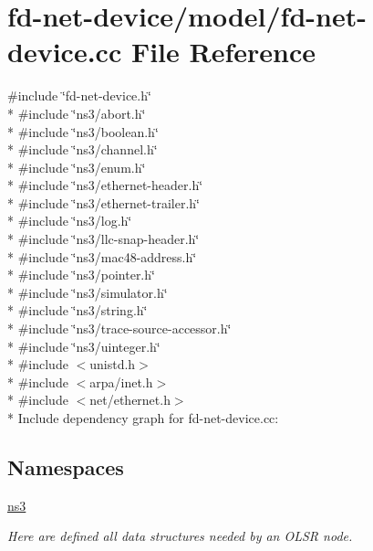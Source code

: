 \hypertarget{fd-net-device_8cc}{}\section{fd-\/net-\/device/model/fd-\/net-\/device.cc File Reference}
\label{fd-net-device_8cc}
{\ttfamily \#include \char`\"{}fd-\/net-\/device.\+h\char`\"{}}\\*
{\ttfamily \#include \char`\"{}ns3/abort.\+h\char`\"{}}\\*
{\ttfamily \#include \char`\"{}ns3/boolean.\+h\char`\"{}}\\*
{\ttfamily \#include \char`\"{}ns3/channel.\+h\char`\"{}}\\*
{\ttfamily \#include \char`\"{}ns3/enum.\+h\char`\"{}}\\*
{\ttfamily \#include \char`\"{}ns3/ethernet-\/header.\+h\char`\"{}}\\*
{\ttfamily \#include \char`\"{}ns3/ethernet-\/trailer.\+h\char`\"{}}\\*
{\ttfamily \#include \char`\"{}ns3/log.\+h\char`\"{}}\\*
{\ttfamily \#include \char`\"{}ns3/llc-\/snap-\/header.\+h\char`\"{}}\\*
{\ttfamily \#include \char`\"{}ns3/mac48-\/address.\+h\char`\"{}}\\*
{\ttfamily \#include \char`\"{}ns3/pointer.\+h\char`\"{}}\\*
{\ttfamily \#include \char`\"{}ns3/simulator.\+h\char`\"{}}\\*
{\ttfamily \#include \char`\"{}ns3/string.\+h\char`\"{}}\\*
{\ttfamily \#include \char`\"{}ns3/trace-\/source-\/accessor.\+h\char`\"{}}\\*
{\ttfamily \#include \char`\"{}ns3/uinteger.\+h\char`\"{}}\\*
{\ttfamily \#include $<$unistd.\+h$>$}\\*
{\ttfamily \#include $<$arpa/inet.\+h$>$}\\*
{\ttfamily \#include $<$net/ethernet.\+h$>$}\\*
Include dependency graph for fd-\/net-\/device.cc\+:
\subsection*{Namespaces}
\begin{DoxyCompactItemize}
\item 
 \hyperlink{namespacens3}{ns3}
\begin{DoxyCompactList}\small\item\em Here are defined all data structures needed by an O\+L\+SR node. \end{DoxyCompactList}\end{DoxyCompactItemize}
